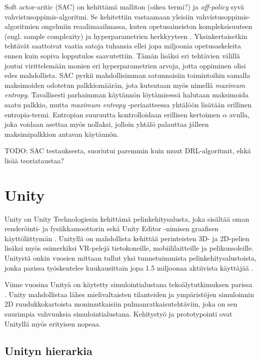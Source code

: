 \documentclass[utf8]{gradu3}
\begin{document}
Soft actor-aritic (SAC) on \textcite{haarnoja2018soft} kehittämä malliton (oikea termi?) ja \textit{off-policy} syvä vahvistusoppimis-algoritmi. Se kehitettiin vastaamaan yleisiin vahvistusoppimis-algoritmien ongelmiin reaalimaailmassa, kuten opetusaineiston kompleksisuuteen (engl. sample complexity) ja hyperparametrien herkkyyteen \parencite{haarnoja2018app}. Yksinkertaisetkin tehtävät saattoivat vaatia satoja tuhansia ellei jopa miljoonia opetusaskeleita ennen kuin sopiva lopputulos saavutettiin. Tämän lisäksi eri tehtävien välillä joutui virittelemään monien eri hyperparametrien arvoja, jotta oppiminen olisi edes mahdollista. SAC pyrkii mahdollisimman satunnaisiin toimintoihin samalla maksimoiden odotetun palkkiomäärän, jota kutsutaan myös nimellä \textit{maximum entropy}. Tavallisesti parhaimman käytännön löytämisessä halutaan maksimoida saatu palkkio, mutta \textit{maximum entropy} -periaatteessa yhtälöön lisätään erillinen entropia-termi. Entropian suuruutta kontrolloidaan erillisen kertoimen $\alpha$ avulla, joka voidaan asettaa myös nollaksi, jolloin yhtälö palauttaa jälleen maksimipalkkion antavan käytännön.

TODO: SAC testauksesta, suoriutui paremmin kuin muut DRL-algoritmit, ehkä lisää teoriataustaa?

\chapter{Unity}
\label{unity}

Unity on Unity Technologiesin kehittämä pelinkehitysalusta, joka sisältää oman renderöinti- ja fysiikkamoottorin sekä Unity Editor -nimisen graafisen käyttöliittymän \parencite{juliani2018unity}. Unityllä on mahdollista kehittää perinteisten 3D- ja 2D-pelien lisäksi myös esimerkiksi VR-pelejä tietokoneille, mobiililaitteille ja pelikonsoleille. Unitystä onkin vuosien mittaan tullut yksi tunnetuimmista pelinkehitysalustoista, jonka parissa työskentelee kuukausittain jopa 1.5 miljoonaa aktiivista käyttäjää \parencite{unityweb}.

Viime vuosina Unityä on käytetty simulointialustana tekoälytutkimuksen parissa \parencite{juliani2018unity}. Unity mahdollistaa lähes mielivaltaisten tilanteiden ja ympäristöjen simuloinnin 2D ruudukkokartoista monimutkaisiin pulmanratkaisutehtäviin, joka on sen suurimpia vahvuuksia simulointialustana. Kehitystyö ja prototypointi ovat Unityllä myös erityisen nopeaa.

\section{Unityn hierarkia}
\end{document}
